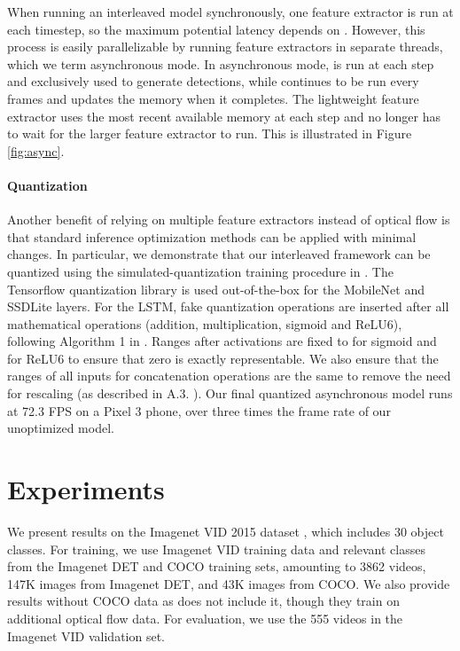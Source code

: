 \documentclass[10pt,twocolumn,letterpaper]{article}
\begin{document}
When running an interleaved model synchronously, one feature extractor is run at each timestep, so the maximum potential latency depends on . However, this process is easily parallelizable by running feature extractors in separate threads, which we term asynchronous mode. In asynchronous mode,  is run at each step and exclusively used to generate detections, while  continues to be run every  frames and updates the memory when it completes. The lightweight feature extractor uses the most recent available memory at each step and no longer has to wait for the larger feature extractor to run. This is illustrated in Figure \ref{fig:async}.

\paragraph{\textbf{Quantization}} Another benefit of relying on multiple feature extractors instead of optical flow is that standard inference optimization methods can be applied with minimal changes. In particular, we demonstrate that our interleaved framework can be quantized using the simulated-quantization training procedure in \cite{jacob2018quantization}. The Tensorflow \cite{Abadi} quantization library is used out-of-the-box for the MobileNet and SSDLite layers. For the LSTM, fake quantization operations are inserted after all mathematical operations (addition, multiplication, sigmoid and ReLU6), following Algorithm 1 in \cite{jacob2018quantization}. Ranges after activations are fixed to  for sigmoid and  for ReLU6 to ensure that zero is exactly representable. We also ensure that the ranges of all inputs for concatenation operations are the same to remove the need for rescaling (as described in A.3. \cite{jacob2018quantization}). Our final quantized asynchronous model runs at 72.3 FPS on a Pixel 3 phone, over three times the frame rate of our unoptimized model.

\section{Experiments}
We present results on the Imagenet VID 2015 dataset \cite{Russakovsky}, which includes 30 object classes. For training, we use Imagenet VID training data and relevant classes from the Imagenet DET \cite{Russakovsky} and COCO \cite{lin2014microsoft} training sets, amounting to 3862 videos, 147K images from Imagenet DET, and 43K images from COCO. We also provide results without COCO data as \cite{zhu2018towardsmobile} does not include it, though they train on additional optical flow data. For evaluation, we use the 555 videos in the Imagenet VID validation set.
\end{document}
